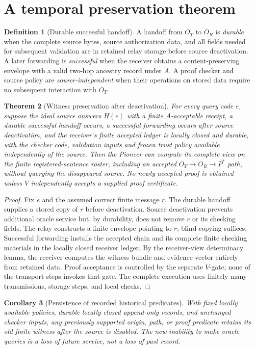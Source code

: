\documentclass[11pt,letterpaper]{article}
\newtheorem{theorem}{Theorem}[section]\newtheorem{lemma}[theorem]{Lemma}\newtheorem{proposition}[theorem]{Proposition}\newtheorem{corollary}[theorem]{Corollary}\theoremstyle{definition}\newtheorem{definition}[theorem]{Definition}\newtheorem{example}[theorem]{Example}\newtheorem{remark}[theorem]{Remark}\newtheorem{conjecture}[theorem]{Conjecture}
\begin{document}
\section{A temporal preservation theorem}
\begin{definition}[Durable successful handoff]
A handoff from $O_T$ to $O_R$ is \emph{durable} when the complete source bytes, source authorization data, and all fields needed for subsequent validation are in retained relay storage before source deactivation. A later forwarding is \emph{successful} when the receiver obtains a content-preserving envelope with a valid two-hop ancestry record under $A$. A proof checker and source policy are \emph{source-independent} when their operations on stored data require no subsequent interaction with $O_T$.
\end{definition}
\begin{theorem}[Witness preservation after deactivation]
For every query code $e$, suppose the ideal source answers $H(e)$ with a finite $A$-acceptable receipt, a durable successful handoff occurs, a successful forwarding occurs after source deactivation, and the receiver's finite accepted ledger is locally closed and durable, with the checker code, validation inputs and frozen trust policy available independently of the source. Then the Pioneer can compute its complete view on the finite registered-sentence roster, including an accepted $O_T\to O_R\to P^*$ path, without querying the disappeared source. No newly accepted proof is obtained unless $V$ independently accepts a supplied proof certificate.
\end{theorem}
\begin{proof}
Fix $e$ and the assumed correct finite message $r$. The durable handoff supplies a stored copy of $r$ before deactivation. Source deactivation prevents additional oracle service but, by durability, does not remove $r$ or its checking fields. The relay constructs a finite envelope pointing to $r$; blind copying suffices. Successful forwarding installs the accepted chain and its complete finite checking materials in the locally closed receiver ledger. By the receiver-view determinacy lemma, the receiver computes the witness bundle and evidence vector entirely from retained data. Proof acceptance is controlled by the separate $V$-gate; none of the transport steps invokes that gate. The complete execution uses finitely many transmissions, storage steps, and local checks.
\end{proof}
\begin{corollary}[Persistence of recorded historical predicates]
With fixed locally available policies, durable locally closed append-only records, and unchanged checker inputs, any previously supported origin, path, or proof predicate retains its old finite witness after the source is disabled. The new inability to make oracle queries is a loss of \emph{future service}, not a loss of \emph{past record}.
\end{corollary}
\end{document}
